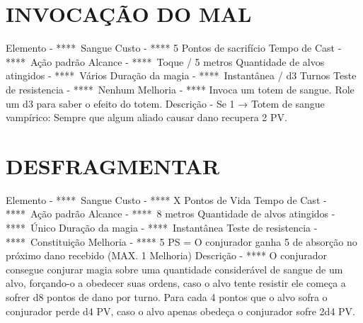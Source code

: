 \documentclass{article}%
\begin{document}
%
\section{INVOCAÇÃO DO MAL}%
\label{sec:INVOCAODOMAL}%
Elemento {-} ****~Sangue\newline%
Custo {-} **** 5 Pontos de sacrifício\newline%
Tempo de Cast {-} ****~Ação padrão\newline%
Alcance {-} ****~Toque / 5 metros\newline%
Quantidade de alvos atingidos {-} ****~Vários\newline%
Duração da magia {-} ****~Instantânea / d3 Turnos\newline%
Teste de resistencia {-} ****~Nenhum\newline%
Melhoria {-} **** Invoca um totem de sangue. Role um d3 para saber o efeito do totem.\newline%
Descrição {-} Se 1 → Totem de sangue vampírico: Sempre que algum aliado causar dano recupera 2 PV.\newline%

%
\section{DESFRAGMENTAR}%
\label{sec:DESFRAGMENTAR}%
Elemento {-} ****~Sangue\newline%
Custo {-} **** X Pontos de Vida\newline%
Tempo de Cast {-} ****~Ação padrão\newline%
Alcance {-} ****~8 metros\newline%
Quantidade de alvos atingidos {-} ****~Único\newline%
Duração da magia {-} ****~Instantânea\newline%
Teste de resistencia {-} ****~Constituição\newline%
Melhoria {-} **** 5 PS = O conjurador ganha 5 de absorção no próximo dano recebido (MAX. 1 Melhoria)\newline%
Descrição {-} **** O conjurador consegue conjurar magia sobre uma quantidade considerável de sangue de um alvo, forçando{-}o a obedecer suas ordens, caso o alvo tente resistir ele começa a sofrer d8 pontos de dano por turno. Para cada 4 pontos que o alvo sofra o conjurador perde d4 PV, caso o alvo apenas obedeça o conjurador sofre 2d4 PV.\newline%

%
\end{document}
